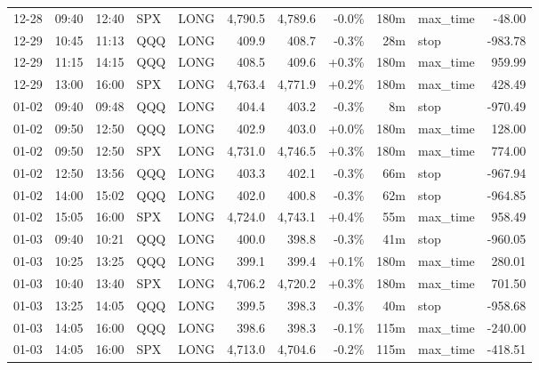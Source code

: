 \documentclass[11pt,a4paper,twoside]{article}
\begin{document}
\begin{center}
\begin{longtable}{>{\color{txtmain}}l l l l l r r r r >{\color{txtmain}}l r}
12-28 & 09:40 & 12:40 & SPX & LONG & 4,790.5 & 4,789.6 & \textcolor{lossred}{-0.0\%} & 180m & max\_time & \textcolor{lossred}{-48.00} \\
12-29 & 10:45 & 11:13 & QQQ & LONG & 409.9 & 408.7 & \textcolor{lossred}{-0.3\%} & 28m & stop & \textcolor{lossred}{-983.78} \\
12-29 & 11:15 & 14:15 & QQQ & LONG & 408.5 & 409.6 & \textcolor{wingreen}{+0.3\%} & 180m & max\_time & \textcolor{wingreen}{959.99} \\
12-29 & 13:00 & 16:00 & SPX & LONG & 4,763.4 & 4,771.9 & \textcolor{wingreen}{+0.2\%} & 180m & max\_time & \textcolor{wingreen}{428.49} \\
01-02 & 09:40 & 09:48 & QQQ & LONG & 404.4 & 403.2 & \textcolor{lossred}{-0.3\%} & 8m & stop & \textcolor{lossred}{-970.49} \\
01-02 & 09:50 & 12:50 & QQQ & LONG & 402.9 & 403.0 & \textcolor{wingreen}{+0.0\%} & 180m & max\_time & \textcolor{wingreen}{128.00} \\
01-02 & 09:50 & 12:50 & SPX & LONG & 4,731.0 & 4,746.5 & \textcolor{wingreen}{+0.3\%} & 180m & max\_time & \textcolor{wingreen}{774.00} \\
01-02 & 12:50 & 13:56 & QQQ & LONG & 403.3 & 402.1 & \textcolor{lossred}{-0.3\%} & 66m & stop & \textcolor{lossred}{-967.94} \\
01-02 & 14:00 & 15:02 & QQQ & LONG & 402.0 & 400.8 & \textcolor{lossred}{-0.3\%} & 62m & stop & \textcolor{lossred}{-964.85} \\
01-02 & 15:05 & 16:00 & SPX & LONG & 4,724.0 & 4,743.1 & \textcolor{wingreen}{+0.4\%} & 55m & max\_time & \textcolor{wingreen}{958.49} \\
01-03 & 09:40 & 10:21 & QQQ & LONG & 400.0 & 398.8 & \textcolor{lossred}{-0.3\%} & 41m & stop & \textcolor{lossred}{-960.05} \\
01-03 & 10:25 & 13:25 & QQQ & LONG & 399.1 & 399.4 & \textcolor{wingreen}{+0.1\%} & 180m & max\_time & \textcolor{wingreen}{280.01} \\
01-03 & 10:40 & 13:40 & SPX & LONG & 4,706.2 & 4,720.2 & \textcolor{wingreen}{+0.3\%} & 180m & max\_time & \textcolor{wingreen}{701.50} \\
01-03 & 13:25 & 14:05 & QQQ & LONG & 399.5 & 398.3 & \textcolor{lossred}{-0.3\%} & 40m & stop & \textcolor{lossred}{-958.68} \\
01-03 & 14:05 & 16:00 & QQQ & LONG & 398.6 & 398.3 & \textcolor{lossred}{-0.1\%} & 115m & max\_time & \textcolor{lossred}{-240.00} \\
01-03 & 14:05 & 16:00 & SPX & LONG & 4,713.0 & 4,704.6 & \textcolor{lossred}{-0.2\%} & 115m & max\_time & \textcolor{lossred}{-418.51} \\

\end{longtable}
\end{center}
\end{document}

